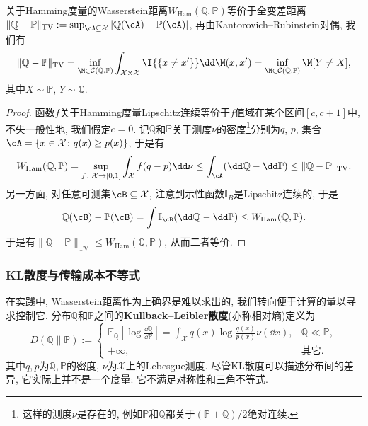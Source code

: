 \begin{example}[Hamming度量和全变差距离]\label{ex:HammingMetricAndTVDistance}
	关于Hamming度量的Wasserstein距离$W_{\text{Ham}}(\mathbb{Q}, \mathbb{P})$等价于全变差距离$\|\mathbb{Q} - \mathbb{P}\|_{\text{TV}} := \sup_{\cA \subseteq \mathcal{X}} |\mathbb{Q}(\cA) - \mathbb{P}(\cA)|$, 再由Kantorovich–Rubinstein对偶, 我们有
	\begin{equation*}
		\|\mathbb{Q} - \mathbb{P}\|_{\text{TV}}
		= \inf_{\M \in \mathcal{C}(\mathbb{Q}, \mathbb{P})} \int_{\mathcal{X} \times \mathcal{X}} \I{\{x \neq x'\}} \dd \M(x, x')
		= \inf_{\M \in \mathcal{C}(\mathbb{Q}, \mathbb{P})} \M[Y \neq X], 
	\end{equation*}
	其中$X \sim \mathbb{P}$, $Y \sim \mathbb{Q}$. 
	\begin{proof}
	函数$f$关于Hamming度量Lipschitz连续等价于$f$值域在某个区间$[c, c+1]$中, 不失一般性地, 我们假定$c = 0$. 
	记$\mathbb{Q}$和$\mathbb{P}$关于测度$\nu$的密度\footnote{这样的测度$\nu$是存在的, 例如$\mathbb{P}$和$\mathbb{Q}$都关于$(\mathbb{P} + \mathbb{Q})/2$绝对连续.}分别为$q$, $p$, 集合$\cA = \{x \in \mathcal{X} \colon q(x) \geq p(x)\} $, 于是有
	\begin{equation*}
		W_{\text{Ham}}(\mathbb{Q}, \mathbb{P})
		= \sup_{f \colon \mathcal{X} \to [0, 1]} \int_{\mathcal{X}} f (q - p) \dd \nu 
		\leq \int_{\cA} (\dd \mathbb{Q} - \dd \mathbb{P})
		\leq \|\mathbb{Q} - \mathbb{P}\|_{\text{TV}}. 
	\end{equation*}
	另一方面, 对任意可测集$\cB \subseteq \mathcal{X}$, 注意到示性函数$\mathbb{I}_B$是Lipschitz连续的, 于是
	\begin{equation*}
		\mathbb{Q}(\cB) - \mathbb{P}(\cB) 
		= \int \mathbb{I}_{\cB} (\dd \mathbb{Q} - \dd \mathbb{P}) 
		\leq W_{\text{Ham}}(\mathbb{Q}, \mathbb{P}). 
	\end{equation*}
	于是有$\|\mathbb{Q} - \mathbb{P}\|_{\text{TV}} \leq W_{\text{Ham}}(\mathbb{Q}, \mathbb{P})$, 从而二者等价. 
	\end{proof}
\end{example}

\subsubsection{KL散度与传输成本不等式}

在实践中, Wasserstein距离作为上确界是难以求出的, 我们转向便于计算的量以寻求控制它. 
分布$\mathbb{Q}$和$\mathbb{P}$之间的\textbf{Kullback–Leibler散度}(亦称相对熵)定义为
\begin{equation}
	D(\mathbb{Q} \| \mathbb{P})
	:= \begin{cases}
		\mathbb{E}_{\mathbb{Q}} \left[ \log \frac{\dd \mathbb{Q}}{\dd \mathbb{P}} \right]
		= \int_{\mathcal{X}} q(x) \log \frac{q(x)}{p(x)} \nu(\dd x), & \mathbb{Q} \ll \mathbb{P}, \\
		+\infty, &\text{其它}. 
	\end{cases} 
\end{equation}
其中$q, p$为$\mathbb{Q}, \mathbb{P}$的密度, $\nu$为$\mathcal{X}$上的Lebesgue测度. 
尽管KL散度可以描述分布间的差异, 它实际上并不是一个度量: 它不满足对称性和三角不等式. 


